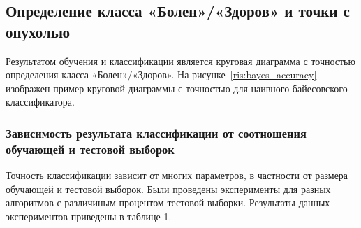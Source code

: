 \subsection{Определение класса «Болен»/«Здоров» и точки с опухолью}
Результатом обучения и классификации является круговая диаграмма с точностью определения класса «Болен»/«Здоров». На рисунке~\ref{ris:bayes_accuracy} изображен пример круговой диаграммы с точностью для наивного байесовского классификатора.
\par
\subsubsection{Зависимость результата классификации от соотношения обучающей и тестовой выборок}
Точность классификации зависит от многих параметров, в частности от размера обучающей и тестовой выборок. Были проведены эксперименты для разных алгоритмов с различиным процентом тестовой выборки. Результаты данных экспериментов приведены в таблице 1.
